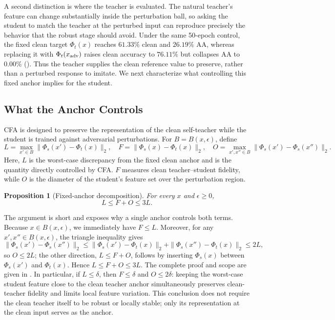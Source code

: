 \documentclass{article} %
\theoremstyle{plain}
\newtheorem{proposition}{Proposition}
\begin{document}
A second distinction is where the teacher is evaluated. The natural teacher's
feature can change substantially inside the perturbation ball, so asking the
student to match the teacher at the perturbed input can reproduce precisely
the behavior that the robust stage should avoid. Under the same 50-epoch
control, the fixed clean target \(\Phi_t(x)\) reaches \(61.33\%\) clean and
\(26.19\%\) AA, whereas replacing it with \(\Phi_t(x_{\rm adv})\) raises
clean accuracy to \(76.11\%\) but collapses AA to \(0.00\%\)
(). Thus the teacher supplies the clean reference value
to preserve, rather than a perturbed response to imitate. We next characterize
what controlling this fixed anchor implies for the student.

\subsection{What the Anchor Controls}
\label{sec:decomp}

CFA is designed to preserve the representation of the clean self-teacher while
the student is trained against adversarial perturbations. For
\(B=B(x,\epsilon)\), define
\begin{equation}
L=\max_{x'\in B}\|\Phi_s(x')-\Phi_t(x)\|_2,\quad
F=\|\Phi_s(x)-\Phi_t(x)\|_2,\quad
O=\max_{x',x''\in B}\|\Phi_s(x')-\Phi_s(x'')\|_2.
\label{eqn:LFO}
\end{equation}
Here, \(L\) is the worst-case discrepancy from the fixed clean anchor and is
the quantity directly controlled by CFA. \(F\) measures clean
teacher--student fidelity, while \(O\) is the diameter of the student's
feature set over the perturbation region.

\begin{proposition}[Fixed-anchor decomposition]\label{prop:decomp}
For every \(x\) and \(\epsilon\ge0\),
\begin{equation}
L\le F+O\le3L.
\label{eqn:decomp}
\end{equation}
\end{proposition}
The argument is short and exposes why a single anchor controls both terms.
Because \(x\in B(x,\epsilon)\), we immediately have \(F\le L\). Moreover,
for any \(x',x''\in B(x,\epsilon)\), the triangle inequality gives
\begin{equation}
\|\Phi_s(x')-\Phi_s(x'')\|_2
\le \|\Phi_s(x')-\Phi_t(x)\|_2
   + \|\Phi_s(x'')-\Phi_t(x)\|_2
\le 2L,
\end{equation}
so \(O\le2L\); the other direction, \(L\le F+O\), follows by inserting
\(\Phi_s(x)\) between \(\Phi_s(x')\) and \(\Phi_t(x)\). Hence
\(L\le F+O\le3L\). The complete proof and scope are given in
. In particular, if \(L\le\delta\), then
\(F\le\delta\) and \(O\le2\delta\): keeping the worst-case student feature
close to the clean teacher anchor simultaneously preserves clean-teacher
fidelity and limits local feature variation. This conclusion does not require
the clean teacher itself to be robust or locally stable; only its
representation at the clean input serves as the anchor.
\end{document}

